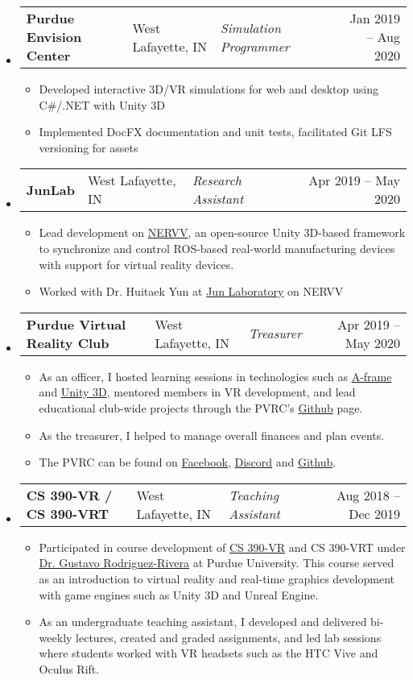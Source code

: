 \documentclass[11pt]{extarticle}
\makeatletter
\newcommand{\entry}[5]{
	\begin{tabularx}{\linewidth}{l@{, }l@{ – }lXr}
			\textbf{#1} & #2 & \lighttext \textit{#3} & & #4 – #5
	\end{tabularx}
	\vspace{-16pt}
}
\makeatother
\begin{document}
\begin{itemize}[leftmargin=1em]
	\item[]
	\entry{Purdue Envision Center}{West Lafayette, IN}{Simulation Programmer}{Jan 2019}{Aug 2020}
	\begin{itemize}
		\item Developed interactive 3D/VR simulations for web and desktop using
		C\#/.NET with Unity 3D
		\item Implemented DocFX documentation and unit tests, facilitated Git LFS
		versioning for assets
	\end{itemize}

	\item[]
	\entry{JunLab}{West Lafayette, IN}{Research Assistant}{Apr 2019}{May 2020}
	\begin{itemize}
		\item Lead development on
		\href{https://github.com/oliviasculley/nervv}{NERVV}, an open-source Unity
		3D-based framework to synchronize and control ROS-based real-world
		manufacturing devices with support for virtual reality devices.
		\item Worked with Dr. Huitaek Yun at
		\href{https://web.ics.purdue.edu/~jun25/}{Jun Laboratory} on NERVV
	\end{itemize}

	\item[]
	\entry{Purdue Virtual Reality Club}{West Lafayette, IN}{Treasurer}{Apr 2019}{May 2020}
	\begin{itemize}
		\item As an officer, I hosted learning sessions in technologies such as
		\href{https://aframe.io/}{A-frame} and \href{https://unity.com/}{Unity 3D},
		mentored members in VR development, and lead educational club-wide projects
		through the PVRC's \href{https://github.com/pvrc}{Github} page.
		\item As the treasurer, I helped to manage overall finances and plan events.
		\item The PVRC can be found on
		\href{https://www.facebook.com/groups/777681062280083/}{Facebook},
		\href{https://discord.gg/2bnDcKE}{Discord} and
		\href{https://github.com/pvrc}{Github}.
	\end{itemize}

	\item[]
	\entry{CS 390-VR / CS 390-VRT}{West Lafayette, IN}{Teaching Assistant}{Aug 2018}{Dec 2019}
	\begin{itemize}
		\item Participated in course development of
		\href{https://www.cs.purdue.edu/homes/cs390vr/}{CS 390-VR} and CS 390-VRT
		under \href{https://www.cs.purdue.edu/people/faculty/grr}{Dr. Gustavo
		Rodriguez-Rivera} at Purdue University. This course served as an
		introduction to virtual reality and real-time graphics development with game
		engines such as Unity 3D and Unreal Engine.
		\item As an undergraduate teaching assistant, I developed and delivered
		bi-weekly lectures, created and graded assignments, and led lab sessions
		where students worked with VR headsets such as the HTC Vive and Oculus Rift.
	\end{itemize}


\end{itemize}
\end{document}
